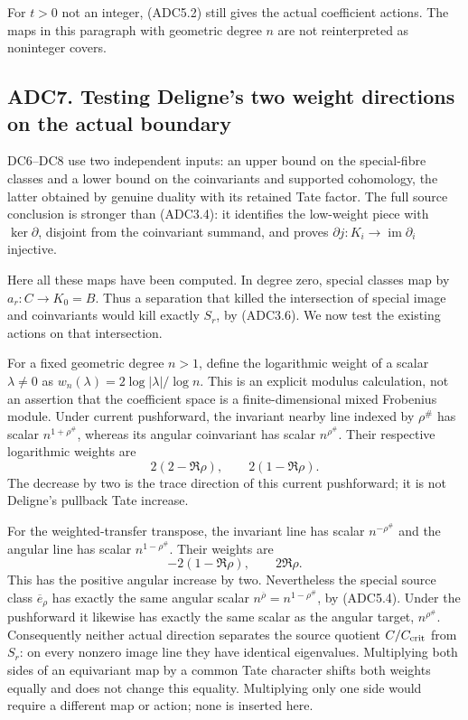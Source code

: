 For \(t>0\) not an integer, (ADC5.2) still gives the actual coefficient
actions. The maps in this paragraph with geometric degree \(n\) are not
reinterpreted as noninteger covers.

\subsection{ADC7. Testing Deligne's two weight directions on the actual
boundary}\label{adc7.-testing-delignes-two-weight-directions-on-the-actual-boundary}

DC6--DC8 use two independent inputs: an upper bound on the special-fibre
classes and a lower bound on the coinvariants and supported cohomology,
the latter obtained by genuine duality with its retained Tate factor.
The full source conclusion is stronger than (ADC3.4): it identifies the
low-weight piece with \(\ker\partial\), disjoint from the coinvariant
summand, and proves \(\partial j:K_i\to\operatorname{im}\partial_i\)
injective.

Here all these maps have been computed. In degree zero, special classes
map by \(a_r:C\to K_0=B\). Thus a separation that killed the
intersection of special image and coinvariants would kill exactly
\(S_r\), by (ADC3.6). We now test the existing actions on that
intersection.

For a fixed geometric degree \(n>1\), define the logarithmic weight of a
scalar \(\lambda\ne0\) as \(w_n(\lambda)=2\log|\lambda|/\log n\). This
is an explicit modulus calculation, not an assertion that the
coefficient space is a finite-dimensional mixed Frobenius module. Under
current pushforward, the invariant nearby line indexed by \(\rho^\#\)
has scalar \(n^{1+\rho^\#}\), whereas its angular coinvariant has scalar
\(n^{\rho^\#}\). Their respective logarithmic weights are \[
2(2-\Re\rho),\qquad 2(1-\Re\rho).
\tag{ADC7.1}
\] The decrease by two is the trace direction of this current
pushforward; it is not Deligne's pullback Tate increase.

For the weighted-transfer transpose, the invariant line has scalar
\(n^{-\rho^\#}\) and the angular line has scalar \(n^{1-\rho^\#}\).
Their weights are \[
-2(1-\Re\rho),\qquad 2\Re\rho.
\tag{ADC7.2}
\] This has the positive angular increase by two. Nevertheless the
special source class \(\overline e_\rho\) has exactly the same angular
scalar \(n^{\overline\rho}=n^{1-\rho^\#}\), by (ADC5.4). Under the
pushforward it likewise has exactly the same scalar as the angular
target, \(n^{\rho^\#}\). Consequently neither actual direction separates
the source quotient \(C/C_{\rm crit}\) from \(S_r\): on every nonzero
image line they have identical eigenvalues. Multiplying both sides of an
equivariant map by a common Tate character shifts both weights equally
and does not change this equality. Multiplying only one side would
require a different map or action; none is inserted here.

